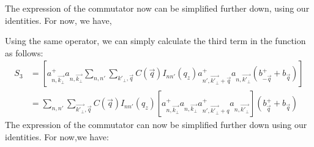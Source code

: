 \documentclass{article}
\begin{document}
The expression of the commutator now can be simplified further down, using our identities. For now, we have, 

Using the same operator, we can simply calculate the third term in the function as follows:
\begin{align*}
    S_3 &= \left[a^+_{n,\vec{k_\bot}}a_{n, \vec{k_\bot}} \sum_{n,n'} \sum_{k'_\bot,\vec{q}}C \left(\vec{q}\right)I_{nn'}(q_z) a^+_{n', \vec{k'_\bot}+ \vec{q}} a_{n, \vec{k'_\bot}}\left(b^+_{-\vec{q}} + b_{\vec{q}}\right)\right]\\
    & = \sum_
    {n,n'} \sum_{\vec{k'_\bot},\vec{q}} C\left(\vec{q}\right) I_{nn'} \left(q_z\right) \left[a^+_{n, \vec{k_\bot}}a_{n, \vec{k_\bot}}a^+_{n', \vec{k'_\bot}+ q} a_{n, \vec{k'_\bot}}\right] \left(b^+_{\vec{q}}+ b _{\vec{q}}\right)
\end{align*}
The expression of the commutator can now be simplified further down using our identities. For now,we have:
\end{document}
